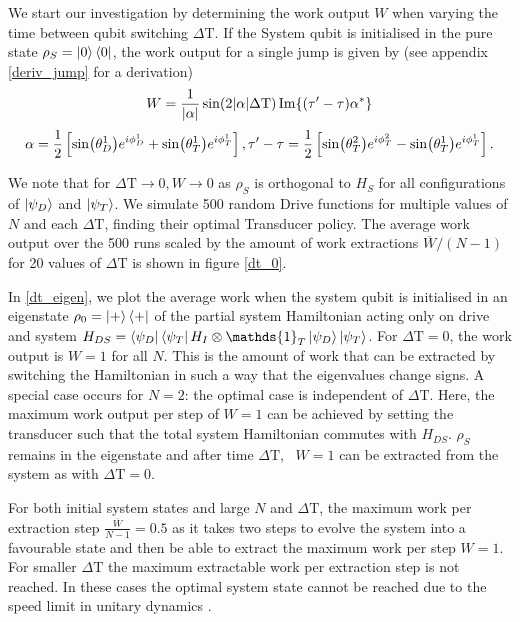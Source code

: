 We start our investigation by determining the work output $W$ when varying the time between qubit switching $\Delta \mathrm{T}$.
If the System qubit is initialised in the pure state $\rho_S = \ket{0} \bra{0}$, the work output for a single jump is given by (see appendix \ref{deriv_jump} for a derivation)
\begin{equation} \label{single_work}
	W = \frac{1}{\abs{\alpha}} \sin(2\abs{\alpha}\Delta \mathrm{T}) \Im{(\tau' - \tau) \alpha^*}
\end{equation}
\begin{equation*}
	\alpha = \frac{1}{2} \left[\sin(\theta_D^1) e^{i\phi_D^1} + \sin(\theta_T^1) e^{i\phi_T^1}\right], \\
	\tau' - \tau = \frac{1}{2} \left[ \sin(\theta_T^2)e^{i\phi_T^2} - \sin(\theta_T^1)e^{i\phi_T^1} \right].
\end{equation*}

We note that for $\Delta \mathrm{T} \to 0, W \to 0$ as $\rho_S$ is orthogonal to $H_S $ for all configurations of $\ket{\psi_D}$ and $ \ket{\psi_T}$.
We simulate 500 random Drive functions for multiple values of $N$ and each $\Delta \mathrm{T}$, finding their optimal Transducer policy. The average work output over the 500 runs scaled by the amount of work extractions $\overline{W}/(N-1)$ for 20 values of $\Delta \mathrm{T}$ is shown in figure \ref{dt_0}.

In \ref{dt_eigen}, we plot the average work when the system qubit is initialised in an eigenstate $\rho_0 = \ket{+}\bra{+}$ of the partial system Hamiltonian acting only on drive and system $H_{DS} = \bra{\psi_D}\bra{\psi_T} H_I \otimes \mathds{1}_T \ket{\psi_D} \ket{\psi_T}$.
For $\Delta \mathrm{T} = 0$, the work output is $W = 1$ for all $N$. This is the amount of work that can be extracted by switching the Hamiltonian in such a way that the eigenvalues change signs.
A special case occurs for $N = 2$: the optimal case is independent of $\Delta \mathrm{T}$.
Here, the maximum work output per step of $W = 1$ can be achieved by setting the transducer such that the total system Hamiltonian commutes with $H_{DS}$. $\rho_S$ remains in the eigenstate and after time $\Delta \mathrm{T}$, \ $W = 1$ can be extracted from the system as with $\Delta \mathrm{T} = 0$.

For both initial system states and large $N$ and $\Delta \mathrm{T}$, the maximum work per extraction step $\frac{\overline{W}}{N-1} = 0.5$ as it takes two steps to evolve the system into a favourable state and then be able to extract the maximum work per step $W = 1$.
For smaller $\Delta \mathrm{T}$ the maximum extractable work per extraction step is not reached. In these cases the optimal system state cannot be reached due to the speed limit in unitary dynamics \cite{Deffner_2017, PhysRevA.67.052109}.

